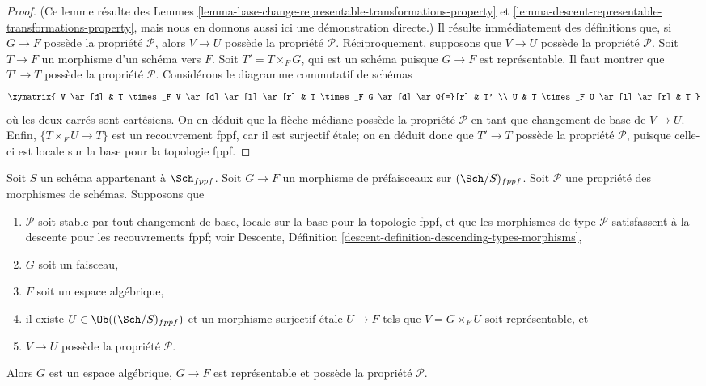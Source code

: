\begin{proof}
(Ce lemme résulte des
Lemmes \ref{lemma-base-change-representable-transformations-property} et
\ref{lemma-descent-representable-transformations-property},
mais nous en donnons aussi ici une démonstration directe.)
Il résulte immédiatement des définitions que, si $G \to F$ possède la propriété
$\mathcal{P}$, alors $V \to U$ possède la propriété $\mathcal{P}$.
Réciproquement, supposons que $V \to U$ possède la propriété $\mathcal{P}$.
Soit $T \to F$ un morphisme d'un schéma vers $F$.
Soit $T' = T \times_F G$, qui est un schéma puisque $G \to F$ est
représentable. Il faut montrer que $T' \to T$ possède la propriété $\mathcal{P}$.
Considérons le diagramme commutatif de schémas
$$
\xymatrix{
V \ar[d] & T \times_F V \ar[d] \ar[l] \ar[r] &
T \times_F G \ar[d] \ar@{=}[r] & T' \\
U & T \times_F U \ar[l] \ar[r] & T
}
$$
où les deux carrés sont cartésiens. On en déduit que
la flèche médiane possède la propriété $\mathcal{P}$ en tant que changement de base
de $V \to U$. Enfin, $\{T \times_F U \to T\}$ est un recouvrement fppf,
car il est surjectif \'etale; on en déduit donc que
$T' \to T$ possède la propriété $\mathcal{P}$, puisque celle-ci est locale sur la
base pour la topologie fppf.
\end{proof}

\begin{lemma}
\label{lemma-morphism-sheaves-with-P-effective-descent-etale}
Soit $S$ un schéma appartenant à $\Sch_{fppf}$.
Soit $G \to F$ un morphisme de préfaisceaux sur $(\Sch/S)_{fppf}$.
Soit $\mathcal{P}$ une propriété des morphismes de schémas.
Supposons que
\begin{enumerate}
\item $\mathcal{P}$ soit stable par tout changement de base, locale sur la
base pour la topologie fppf, et que les morphismes de type $\mathcal{P}$ satisfassent à la descente pour les recouvrements fppf;
voir Descente, Définition \ref{descent-definition-descending-types-morphisms},
\item $G$ soit un faisceau,
\item $F$ soit un espace algébrique,
\item il existe $U \in \Ob((\Sch/S)_{fppf})$
et un morphisme surjectif \'etale $U \to F$ tels que
$V = G \times_F U$ soit représentable, et
\item $V \to U$ possède la propriété $\mathcal{P}$.
\end{enumerate}
Alors $G$ est un espace algébrique, $G \to F$ est représentable et possède la propriété
$\mathcal{P}$.
\end{lemma}


